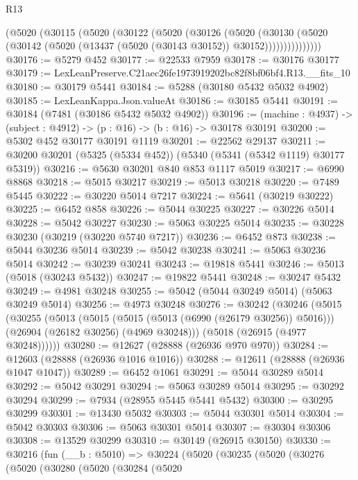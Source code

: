 \begin{lexlean}{R13}
\begin{coremodule}
          (@5020
            (@30115
              (@5020
                (@30122
                  (@5020
                    (@30126
                      (@5020
                        (@30130
                          (@5020
                            (@30142 (@5020 (@13437 (@5020 (@30143 @30152)) @30152)))))))))))))))
@30176 := @5279 @452
@30177 := @22533 @7959
@30178 := @30176 @30177
@30179 := LexLeanPreserve.C21aec26fe1973919202bc82f8bf06bf4.R13.__fits_10
@30180 := @30179 @5441
@30184 := @5288 (@30180 @5432 @5032 @4902)
@30185 := LexLeanKappa.Json.valueAt
@30186 := @30185 @5441
@30191 := @30184 (@7481 (@30186 @5432 @5032 @4902))
@30196 := (machine : @4937) -> (subject : @4912) -> (p : @16) -> (b : @16) -> @30178 @30191
@30200 := @5302 @452 @30177 @30191 @1119
@30201 := @22562 @29137
@30211 := @30200 @30201 (@5325 (@5334 @452)) (@5340 (@5341 (@5342 @1119) @30177 @5319))
@30216 := @5630 @30201 @840 @853 @1117 @5019
@30217 := @6990 @8868
@30218 := @5015 @30217
@30219 := @5013 @30218
@30220 := @7489 @5445
@30222 := @30220 @5014 @7217
@30224 := @5641 (@30219 @30222)
@30225 := @6452 @858
@30226 := @5044 @30225
@30227 := @30226 @5014
@30228 := @5042 @30227
@30230 := @5063 @30225 @5014
@30235 := @30228 @30230 (@30219 (@30220 @5740 @7217))
@30236 := @6452 @873
@30238 := @5044 @30236 @5014
@30239 := @5042 @30238
@30241 := @5063 @30236 @5014
@30242 := @30239 @30241
@30243 := @19818 @5441
@30246 := @5013 (@5018 (@30243 @5432))
@30247 := @19822 @5441
@30248 := @30247 @5432
@30249 := @4981 @30248
@30255 := @5042 (@5044 @30249 @5014) (@5063 @30249 @5014)
@30256 := @4973 @30248
@30276 := @30242
    (@30246
      (@5015
        (@30255
          (@5013
            (@5015 (@5015 (@5013 (@6990 (@26179 @30256)) @5016)))
            (@26904 (@26182 @30256) (@4969 @30248)))
          (@5018 (@26915 (@4977 @30248))))))
@30280 := @12627 (@28888 (@26936 @970 @970))
@30284 := @12603 (@28888 (@26936 @1016 @1016))
@30288 := @12611 (@28888 (@26936 @1047 @1047))
@30289 := @6452 @1061
@30291 := @5044 @30289 @5014
@30292 := @5042 @30291
@30294 := @5063 @30289 @5014
@30295 := @30292 @30294
@30299 := @7934 (@28955 @5445 @5441 @5432)
@30300 := @30295 @30299
@30301 := @13430 @5032
@30303 := @5044 @30301 @5014
@30304 := @5042 @30303
@30306 := @5063 @30301 @5014
@30307 := @30304 @30306
@30308 := @13529 @30299
@30310 := @30149 (@26915 @30150)
@30330 := @30216
    (fun (__b : @5010) =>
    @30224
      (@5020
        (@30235
          (@5020
            (@30276
              (@5020
                (@30280
                  (@5020
                    (@30284
                      (@5020

\end{coremodule}
\end{lexlean}
